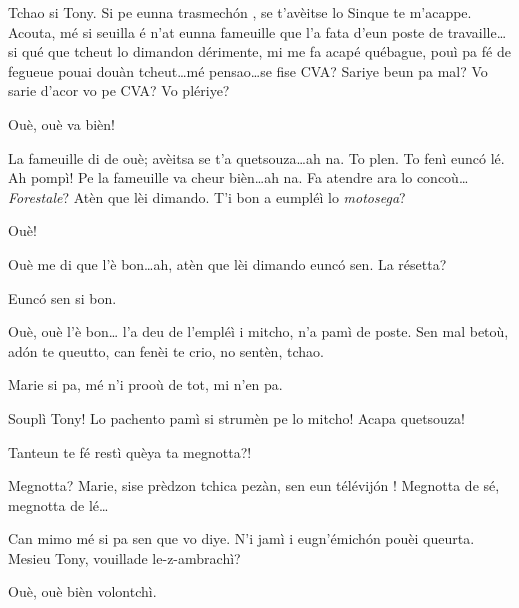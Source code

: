 \begin{drama}

\Turispeaks{} Tchao si Tony. Si pe eunna trasmech\'on , se t'avèitse lo Sinque te m'acappe. Acouta, mé si seuilla é n'at eunna fameuille que l'a fata d'eun poste de travaille\ldots si qué que tcheut lo dimandon dérimente, mi me fa acapé québague, pouì pa fé de fegueue pouai douàn tcheut\ldots mé pensao\ldots se fise CVA? Sariye beun pa mal?  Vo sarie d'acor vo pe CVA? Vo plériye?


\Tanteunspeaks Ouè, ouè va bièn!

\Turispeaks{} La fameuille di de ouè; avèitsa se t'a quetsouza\ldots ah na. To plen. To fenì eunc\'o lé. Ah pompì! Pe la fameuille va cheur bièn\ldots ah na. Fa atendre ara lo concoù\ldots \textit{Forestale}? Atèn que lèi dimando.  T'i bon a eumpléì lo \textit{motosega}?

\Twitterspeaks{} Ouè!

\Turispeaks{} Ouè me di que l'è bon\ldots ah, atèn que lèi dimando eunc\'o sen.  La résetta?

\Twitterspeaks{} Eunc\'o sen si bon.

\Turispeaks{} Ouè, ouè l'è bon\ldots {} l'a deu de l'empléì i mitcho, n'a pamì de poste.  Sen mal betoù, ad\'on te queutto, can fenèi te crio, no sentèn, tchao.


\Turispeaks Marie si pa, mé n'i prooù de tot, mi n'en pa.

\Ipadspeaks Souplì Tony! Lo pachento pamì si strumèn pe lo mitcho! Acapa quetsouza!

\Alicespeaks{} Tanteun te fé restì quèya ta megnotta?!

\Turispeaks Megnotta? Marie, sise prèdzon tchica pezàn, sen eun télévij\'on ! Megnotta de sé, megnotta de lé\ldots


\Mariespeaks Can mimo mé si pa sen que vo diye. N'i jamì i eugn'émich\'on pouèi queurta. Mesieu Tony, vouillade le-z-ambrachì?

\Turispeaks Ouè, ouè bièn volontchì.


\end{drama}
